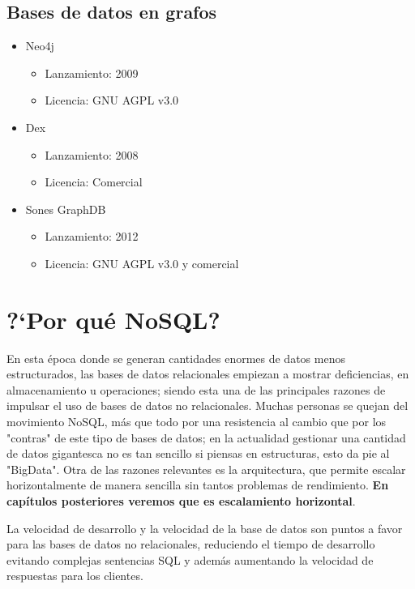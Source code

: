\subsection*{Bases de datos en grafos}

\begin{itemize}
\item Neo4j
    \begin{itemize}
        \item Lanzamiento: 2009
        \item Licencia: GNU AGPL v3.0
    \end{itemize}
\item Dex
    \begin{itemize}
        \item Lanzamiento: 2008
        \item Licencia: Comercial
    \end{itemize}
\item Sones GraphDB
    \begin{itemize}
        \item Lanzamiento: 2012
        \item Licencia: GNU AGPL v3.0 y comercial
    \end{itemize}
\end{itemize}


\section{?`Por qu\'e NoSQL?}

En esta \'epoca donde se generan cantidades enormes de datos menos estructurados, las bases de datos relacionales empiezan a mostrar deficiencias, en almacenamiento u operaciones; siendo esta una de las principales razones de impulsar el uso de bases de datos no relacionales. Muchas personas se quejan del movimiento NoSQL, m\'as que todo por una resistencia al cambio que por los "contras" de este tipo de bases de datos; en la actualidad gestionar una cantidad de datos gigantesca no es tan sencillo si piensas en estructuras, esto da pie al "BigData". Otra de las razones relevantes es la arquitectura, que permite escalar horizontalmente de manera sencilla sin tantos problemas de rendimiento. \textbf{En cap\'itulos posteriores veremos que es escalamiento horizontal}.

La velocidad de desarrollo y la velocidad de la base de datos son puntos a favor para las bases de datos no relacionales, reduciendo el tiempo de desarrollo evitando complejas sentencias SQL y adem\'as aumentando la velocidad de respuestas para los clientes.
